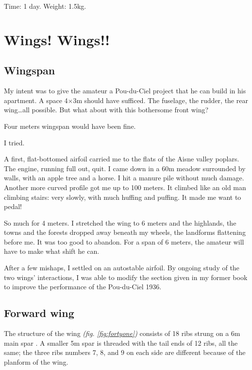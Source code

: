 \documentclass{book}
\newcommand*\circled[1]{\tikz[baseline=(char.base)]{
    \node[shape=circle,draw,inner sep=0.15pt] (char) {\footnotesize#1};}}
\begin{document}
Time: 1 day.  Weight: 1.5kg.

\chapter{Wings! Wings!!}

\section{Wingspan}

My intent was to give the amateur a Pou-du-Ciel project that he can
build in his apartment.  A space 4$\times$3m should have sufficed.
The fuselage, the rudder, the rear wing\ldots all possible.  But what
about with this bothersome front wing?

Four meters wingspan would have been fine.

I tried.

A first, flat-bottomed airfoil carried me to the flats of the Aisne
valley poplars.  The engine, running full out, quit.  I came down in a
60m meadow surrounded by walls, with an apple tree and a horse.  I hit
a manure pile without much damage.  Another more curved profile got me
up to 100 meters.  It climbed like an old man climbing stairs: very
slowly, with much huffing and puffing.  It made me want to pedal!

So much for 4 meters.  I stretched the wing to 6 meters and the
highlands, the towns and the forests dropped away beneath my wheels,
the landforms flattening before me.  It was too good to abandon.  For
a span of 6 meters, the amateur will have to make what shift he can.

After a few mishaps, I settled on an autostable airfoil.  By ongoing
study of the two wings' interactions, I was able to modify the section
given in my former book to improve the performance of the Pou-du-Ciel
1936.

\section{Forward wing}

The structure of the wing \textit{(fig. \ref{fig:fortyone})} consists
of 18 ribs strung on a 6m main spar \circled{200}.  A smaller 5m spar
\circled{201} is threaded with the tail ends of 12 ribs, all the same;
the three ribs numbers 7, 8, and 9 on each side are different because
of the planform of the wing.
\end{document}
